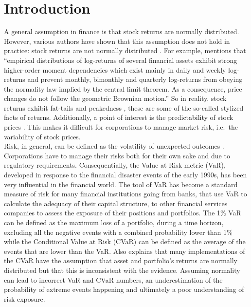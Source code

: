 \documentclass[a4paper, nobind]{templates/ociamthesis}
\begin{document}
\hypertarget{introduction}{%
\chapter*{Introduction}\label{introduction}}

\adjustmtc
{}

\noindent A general assumption in finance is that stock returns are normally distributed. However, various authors have shown that this assumption does not hold in practice: stock returns are not normally distributed \autocites[among which][]{theodossiou2000,subbotin1923,theodossiou2015}. For example, \textcite{theodossiou2000} mentions that ``empirical distributions of log-returns of several financial assets exhibit strong higher-order moment dependencies which exist mainly in daily and weekly log-returns and prevent monthly, bimonthly and quarterly log-returns from obeying the normality law implied by the central limit theorem. As a consequence, price changes do not follow the geometric Brownian motion.'' So in reality, stock returns exhibit fat-tails and peakedness \autocite{Officer1972}, these are some of the so-called stylized facts of returns. Additionally, a point of interest is the predictability of stock prices \autocite{fama1965,Fama1970,welch2008}. This makes it difficult for corporations to manage market risk, i.e.~the variability of stock prices.~\\

\noindent Risk, in general, can be defined as the volatility of unexpected outcomes \autocite{jorion2007}. Corporations have to manage their risks both for their own sake and due to regulatory requirements. Consequentially, the Value at Risk metric (VaR), developed in response to the financial disaster events of the early 1990s, has been very influential in the financial world. The tool of VaR has become a standard measure of risk for many financial institutions going from banks, that use VaR to calculate the adequacy of their capital structure, to other financial services companies to assess the exposure of their positions and portfolios. The 1\% VaR can be defined as the maximum loss of a portfolio, during a time horizon, excluding all the negative events with a combined probability lower than 1\% while the Conditional Value at Risk (CVaR) can be defined as the average of the events that are lower than the VaR. Also \textcite{bali2008} explains that many implementations of the CVaR have the assumption that asset and portfolio's returns are normally distributed but that this is inconsistent with the evidence. Assuming normality can lead to incorrect VaR and CVaR numbers, an underestimation of the probability of extreme events happening and ultimately a poor understanding of risk exposure.~\\
\end{document}

